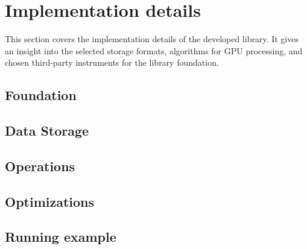 \section{Implementation details}

This section covers the implementation details of the developed library. It gives an insight into the selected storage formats, algorithms for GPU processing, and chosen third-party instruments for the library foundation.

\subsection{Foundation}

\subsection{Data Storage}

\subsection{Operations}

\subsection{Optimizations}

\subsection{Running example}




